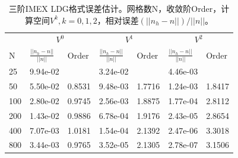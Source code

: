 \begin{table}
    \begin{tabularx}{\textwidth}{@{} *7{X} @{}}
        \toprule
            & \multicolumn{2}{c}{$V^0$} & \multicolumn{2}{c}{$V^1$} & \multicolumn{2}{c}{$V^2$}                                                     \\
        \cmidrule(lr){2-3} \cmidrule(lr){4-5} \cmidrule(lr){6-7}
        N   & $\frac{||n_h-n||}{||n||}$ & Order                     & $\frac{||n_h-n||}{||n||}$ & Order     & $\frac{||n_h-n||}{||n||}$ & Order     \\
        \midrule
        25  & 9.94e-02                  & \text{——}                 & 3.24e-02                  & \text{——} & 4.46e-03                  & \text{——} \\
        50  & 5.50e-02                  & 0.8531                    & 9.48e-03                  & 1.7716    & 1.24e-03                  & 1.8417    \\
        100 & 2.80e-02                  & 0.9745                    & 2.56e-03                  & 1.8875    & 1.77e-04                  & 2.8112    \\
        200 & 1.43e-02                  & 0.9886                    & 6.78e-04                  & 1.9176    & 2.43e-05                  & 2.8654    \\
        400 & 7.07e-03                  & 1.0181                    & 1.54e-04                  & 2.1392    & 2.47e-06                  & 3.3018    \\
        800 & 3.44e-03                  & 0.9765                    & 3.52e-05                  & 2.1305    & 2.78e-07                  & 3.1506    \\
        \bottomrule
    \end{tabularx}
    \caption{三阶IMEX LDG格式误差估计。网格数N，收敛阶Order，计算空间$V^k, k=0,1,2$，相对误差$(||n_h-n||)/||n||$。}
    \label{tab:IMEXLDGerror:3}
\end{table}

